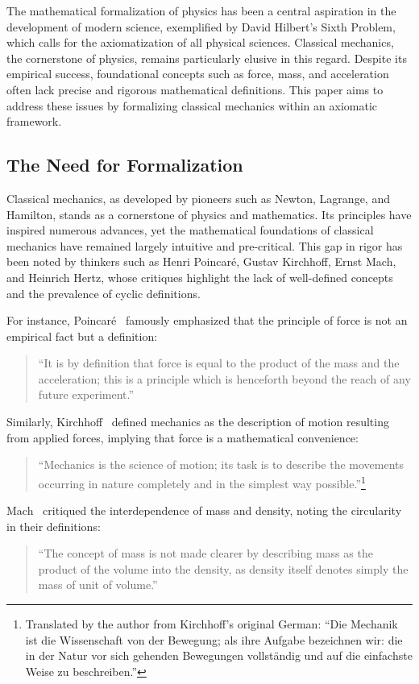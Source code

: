 \documentclass[12pt]{amsart}
\begin{document}
The mathematical formalization of physics has been a central aspiration in the development of modern science, exemplified by David Hilbert's Sixth Problem, which calls for the axiomatization of all physical sciences. Classical mechanics, the cornerstone of physics, remains particularly elusive in this regard. Despite its empirical success, foundational concepts such as force, mass, and acceleration often lack precise and rigorous mathematical definitions. This paper aims to address these issues by formalizing classical mechanics within an axiomatic framework.

\subsection{The Need for Formalization}
Classical mechanics, as developed by pioneers such as Newton, Lagrange, and Hamilton, stands as a cornerstone of physics and mathematics. Its principles have inspired numerous advances, yet the mathematical foundations of classical mechanics have remained largely intuitive and pre-critical. This gap in rigor has been noted by thinkers such as Henri Poincaré, Gustav Kirchhoff, Ernst Mach, and Heinrich Hertz, whose critiques highlight the lack of well-defined concepts and the prevalence of cyclic definitions.

For instance, Poincaré~\cite{poincare1905} famously emphasized that the principle of force is not an empirical fact but a definition:  
\begin{quote}
    ``It is by definition that force is equal to the product of the mass and the acceleration; this is a principle which is henceforth beyond the reach of any future experiment.''
\end{quote}

Similarly, Kirchhoff~\cite{kirchhoff1877} defined mechanics as the description of motion resulting from applied forces, implying that force is a mathematical convenience:  
\begin{quote}
    ``Mechanics is the science of motion; its task is to describe the movements occurring in nature completely and in the simplest way possible.''\footnote{Translated by the author from Kirchhoff's original German: ``Die Mechanik ist die Wissenschaft von der Bewegung; als ihre Aufgabe bezeichnen wir: die in der Natur vor sich gehenden Bewegungen vollständig und auf die einfachste Weise zu beschreiben.''}
\end{quote}

Mach~\cite{mach1893} critiqued the interdependence of mass and density, noting the circularity in their definitions:  
\begin{quote}
    ``The concept of mass is not made clearer by describing mass as the product of the volume into the density, as density itself denotes simply the mass of unit of volume.''
\end{quote}
\end{document}
